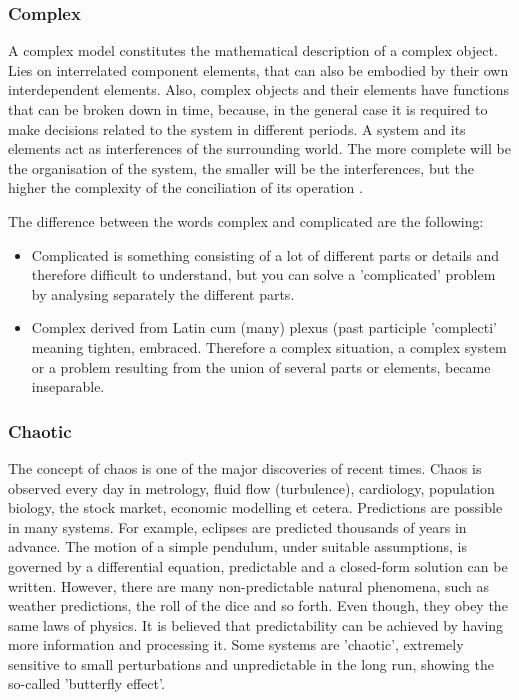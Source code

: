\documentclass[11pt, letterpaper, english]{article}
\begin{document}
    \subsubsection{Complex}
    \par{A complex model constitutes the mathematical description of a complex object. Lies on interrelated component elements, that can also be embodied by their own interdependent elements. Also, complex objects and their elements have functions that can be broken down in time, because, in the general case it is required to make decisions related to the system in different periods. A system and its elements act as interferences of the surrounding world. The more complete will be the organisation of the system, the smaller will be the interferences, but the higher the complexity of the conciliation of its operation  \cite{garfinkel_shevtsov_guo_2017}.}
    \par{The difference between  the words complex and complicated are the following:
    \begin{itemize}
        \item Complicated is something consisting of a lot of different parts or details and therefore difficult to understand, but you can solve a 'complicated' problem by analysing separately the different parts.
        \item Complex derived from Latin cum (many) plexus (past participle 'complecti' meaning tighten, embraced. Therefore a complex situation, a complex system or a problem resulting from the union of several parts or elements, became inseparable.
    \end{itemize}}
    
    \subsubsection{Chaotic}
    \par{The concept of chaos is one of the major discoveries of recent times. Chaos is observed every day in metrology, fluid flow (turbulence), cardiology, population biology, the stock market, economic modelling et cetera. Predictions are possible in many systems. For example, eclipses are predicted thousands of years in advance. The motion of a simple pendulum, under suitable assumptions, is governed by a differential equation, predictable and a closed-form solution can be written. However, there are many non-predictable natural phenomena, such as weather predictions, the roll of the dice and so forth. Even though, they obey the same laws of physics. It is believed that predictability can be achieved by having more information and processing it. Some systems are 'chaotic', extremely sensitive to small perturbations and unpredictable in the long run, showing the so-called 'butterfly effect'. \cite{garfinkel_shevtsov_guo_2017}}
    
\end{document}
